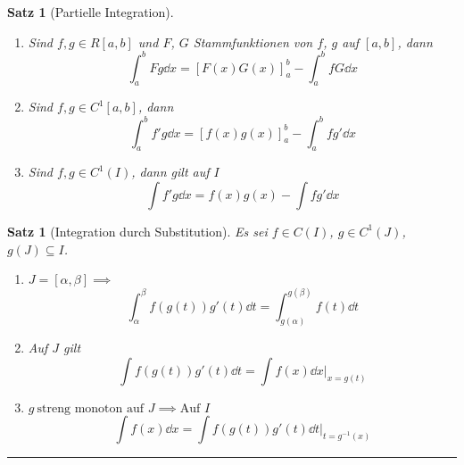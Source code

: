 \documentclass[a4paper]{article}
\newcounter{Sec}
\theoremstyle{marginbreak}
\newtheorem{satz}[definition]{Satz}
\newcommand{\sep}{%
	\rule{\textwidth}{0.3pt}%
	\stepcounter{Sec}%
	}
\renewcommand{\d}{\dd}
\begin{document}
	\begin{satz}[Partielle Integration]
		\begin{enumerate}[label=(\alph*)]
			\item Sind $f,g\in R[a,b]$ und $F$, $G$ Stammfunktionen von $f$, $g$
				auf $[a,b]$, dann
				\[ \int_a^bFg\d{x}=[F(x)G(x)]_a^b-\int_a^bfG\d{x} \]
			\item Sind $f,g\in C^1[a,b]$, dann
				\[ \int_a^bf'g\d{x}=[f(x)g(x)]_a^b-\int_a^bfg'\d{x} \]
			\item Sind $f,g\in C^1(I)$, dann gilt auf $I$
				\[ \int f'g\d{x}=f(x)g(x)-\int fg'\d{x} \]
		\end{enumerate}
	\end{satz}
	\begin{satz}[Integration durch Substitution]
		Es sei $f\in C(I)$, $g\in C^1(J)$, $g(J)\subseteq I$.
		\begin{enumerate}[label=(\alph*)]
			\item $J = [\alpha,\beta]\implies$
				\[ \int_\alpha^\beta f(g(t))g'(t)\d{t}=\int_{g(\alpha)}^{g(\beta)}f(t)\d{t} \]
			\item Auf $J$ gilt
				\[ \int f(g(t))g'(t)\d{t}=\int f(x)\d{x}|_{x=g(t)} \]
			\item $g~\text{streng monoton auf $J$}\implies\text{Auf $I$}$
				\[ \int f(x)\d{x}=\int f(g(t))g'(t)\d{t}|_{t=g^{-1}(x)} \]
		\end{enumerate}
	\end{satz}
	\newpage
	\sep
\end{document}

